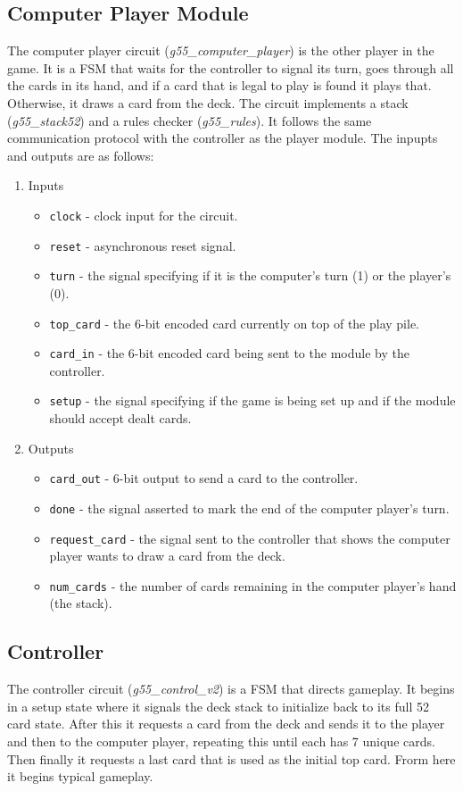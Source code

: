 \documentclass[12pt]{article}
\begin{document}
\subsection{Computer Player Module}
The computer player circuit (\textit{g55\_computer\_player}) is the other player in the game. It is a FSM that waits for the controller to signal its turn, goes through all the cards in its hand, and if a card that is legal to play is found it plays that. Otherwise, it draws a card from the deck.  The circuit implements a stack (\textit{g55\_stack52}) and a rules checker (\textit{g55\_rules}). It follows the same communication protocol with the controller as the player module. The inpupts and outputs are as follows:\\

\begin{enumerate}
\item Inputs
\begin{itemize}
\item \texttt{clock} - clock input for the circuit.
\item \texttt{reset} - asynchronous reset signal.
\item \texttt{turn} - the signal specifying if it is the computer's turn (1) or the player's (0).
\item \texttt{top\_card} - the 6-bit encoded card currently on top of the play pile.
\item \texttt{card\_in} - the 6-bit encoded card being sent to the module by the controller.
\item \texttt{setup} - the signal specifying if the game is being set up and if the module should accept dealt cards.
\end{itemize}
\item Outputs
\begin{itemize}
\item \texttt{card\_out} - 6-bit output to send a card to the controller.
\item \texttt{done} - the signal asserted to mark the end of the computer player's turn.
\item \texttt{request\_card} - the signal sent to the controller that shows the computer player wants to draw a card from the deck.
\item \texttt{num\_cards} - the number of cards remaining in the computer player's hand (the stack).
\end{itemize}
\end{enumerate}

\subsection{Controller}
The controller circuit (\textit{g55\_control\_v2}) is a FSM that directs gameplay. It begins in a setup state where it signals the deck stack to initialize back to its full 52 card state. After this it requests a card from the deck and sends it to the player and then to the computer player, repeating this until each has 7 unique cards. Then finally it requests a last card that is used as the initial top card. Frorm here it begins typical gameplay.\\
\end{document}
